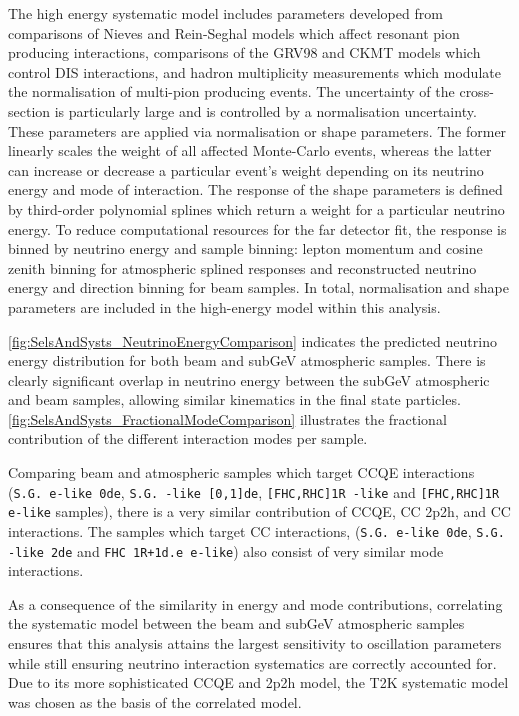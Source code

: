 The high energy systematic model includes parameters developed from comparisons of Nieves and Rein-Seghal models which affect resonant pion producing interactions, comparisons of the GRV98 and CKMT models which control DIS interactions, and hadron multiplicity measurements which modulate the normalisation of multi-pion producing events. The uncertainty of the \quickmath{\nu_{\tau}} cross-section is particularly large and is controlled by a  normalisation uncertainty. These parameters are applied via normalisation or shape parameters. The former linearly scales the weight of all affected Monte-Carlo events, whereas the latter can increase or decrease a particular event's weight depending on its neutrino energy and mode of interaction. The response of the shape parameters is defined by third-order polynomial splines which return a weight for a particular neutrino energy. To reduce computational resources for the far detector fit, the response is binned by neutrino energy and sample binning: lepton momentum and cosine zenith binning for atmospheric splined responses and reconstructed neutrino energy and direction binning for beam samples. In total,  normalisation and  shape parameters are included in the high-energy model within this analysis.

\autoref{fig:SelsAndSysts_NeutrinoEnergyComparison} indicates the predicted neutrino energy distribution for both beam and subGeV atmospheric samples. There is clearly significant overlap in neutrino energy between the subGeV atmospheric and beam samples, allowing similar kinematics in the final state particles. \autoref{fig:SelsAndSysts_FractionalModeComparison} illustrates the fractional contribution of the different interaction modes per sample.

Comparing beam and atmospheric samples which target CCQE interactions (\texttt{S.G. e-like 0de}, \texttt{S.G. \quickmath{\mu}-like [0,1]de}, \texttt{[FHC,RHC]1R \quickmath{\mu}-like} and \texttt{[FHC,RHC]1R e-like} samples), there is a very similar contribution of CCQE, CC 2p2h, and CC\quickmath{1\pi^{\pm}} interactions. The samples which target CC\quickmath{1\pi^{\pm}} interactions, (\texttt{S.G. e-like 0de}, \texttt{S.G. \quickmath{\mu}-like 2de} and \texttt{FHC 1R+1d.e e-like}) also consist of very similar mode interactions.

As a consequence of the similarity in energy and mode contributions, correlating the systematic model between the beam and subGeV atmospheric samples ensures that this analysis attains the largest sensitivity to oscillation parameters while still ensuring neutrino interaction systematics are correctly accounted for. Due to its more sophisticated CCQE and 2p2h model, the T2K systematic model was chosen as the basis of the correlated model. 

